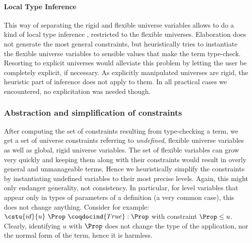 

\paragraph{Local Type Inference}
This way of separating the rigid and flexible universe variables
allows to do a kind of local type inference \cite{pierce-turner-00},
restricted to the flexible universes. Elaboration does not generate
the most general constraints, but heuristically tries to instantiate
the flexible universe variables to sensible values that make the term
type-check. Resorting to explicit universes would alleviate this
problem by letting the user be completely explicit, if necessary. As
explicitly manipulated universes are rigid, the heuristic part of
inference does not apply to them. In all practical cases we
encountered, no explicitation was needed though.

\subsubsection{Abstraction and simplification of constraints}

After computing the set of constraints resulting from type-checking a
term, we get a set of universe constraints referring to
\emph{undefined}, flexible universe variables as well as global, rigid
universe variables. The set of flexible variables can grow very quickly
and keeping them along with their constraints would result in overly
general and unmanageable terms. Hence we heuristically simplify the
constraints by instantiating undefined variables to their most precise
levels. Again, this might only endanger generality, not consistency. In
particular, for level variables that appear only in types of parameters
of a definition (a very common case), this does not change
anything. Consider for example: $\cstu{id}{u}~\Prop~\coqdocind{True} :
\Prop$ with constraint $\Prop \leq u$. Clearly, identifying $u$ with
$\Prop$ does not change the type of the application, nor the normal form
of the term, hence it is harmless.

